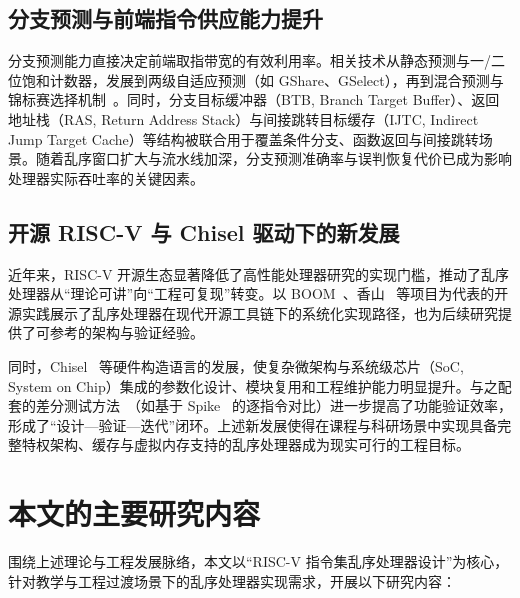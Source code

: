 \subsection{分支预测与前端指令供应能力提升}

分支预测能力直接决定前端取指带宽的有效利用率。相关技术从静态预测与一/二位饱和计数器，发展到两级自适应预测（如 GShare、GSelect）\cite{mcfarling1993combining}，再到混合预测与锦标赛选择机制~\cite{razilov2024tage}。同时，分支目标缓冲器（BTB, Branch Target Buffer）、返回地址栈（RAS, Return Address Stack）与间接跳转目标缓存（IJTC, Indirect Jump Target Cache）等结构被联合用于覆盖条件分支、函数返回与间接跳转场景。随着乱序窗口扩大与流水线加深，分支预测准确率与误判恢复代价已成为影响处理器实际吞吐率的关键因素。

\subsection{开源 RISC-V 与 Chisel 驱动下的新发展}

近年来，RISC-V 开源生态显著降低了高性能处理器研究的实现门槛，推动了乱序处理器从“理论可讲”向“工程可复现”转变。以 BOOM~\cite{zhao2020sonicboom}、香山~\cite{wang2023xiangshan} 等项目为代表的开源实践展示了乱序处理器在现代开源工具链下的系统化实现路径，也为后续研究提供了可参考的架构与验证经验。

同时，Chisel~\cite{bachrach2012chisel} 等硬件构造语言的发展，使复杂微架构与系统级芯片（SoC, System on Chip）集成的参数化设计、模块复用和工程维护能力明显提升。与之配套的差分测试方法~\cite{you2025difftest}（如基于 Spike~\cite{spike2026} 的逐指令对比）进一步提高了功能验证效率，形成了“设计—验证—迭代”闭环。上述新发展使得在课程与科研场景中实现具备完整特权架构、缓存与虚拟内存支持的乱序处理器成为现实可行的工程目标。

\section{本文的主要研究内容}

围绕上述理论与工程发展脉络，本文以“RISC-V 指令集乱序处理器设计”为核心，针对教学与工程过渡场景下的乱序处理器实现需求，开展以下研究内容：

